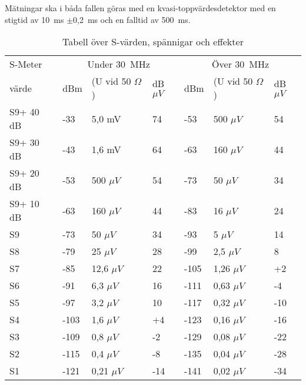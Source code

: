 Mätningar ska i båda fallen göras med en kvasi-toppvärdesdetektor
med en stigtid av 10~ms \(\pm\)0,2~ms och en falltid av 500~ms.

\onecolumn
\begin{table}[ht]
	\centering
	\begin{tabular}{l|lll|lll}
    S-Meter  & \multicolumn{3}{c}{Under 30~MHz} & \multicolumn{3}{c}{Över 30~MHz} \\
    värde    & dBm & (U vid 50 \(\Omega\)) & dB\(\mu V\) & dBm & (U vid 50 \(\Omega\)) & dB\(\mu V\) \\
    \hline
    S9+ 40 dB & -33  & 5,0 mV  & 74  & -53  & 500 \(\mu V\) & 54  \\
    S9+ 30 dB & -43  & 1,6 mV  & 64  & -63  & 160 \(\mu V\) & 44  \\
    S9+ 20 dB & -53  & 500 \(\mu V\)  & 54  & -73  & 50 \(\mu V\) & 34  \\
    S9+ 10 dB & -63  & 160 \(\mu V\)  & 44  & -83  & 16 \(\mu V\) & 24  \\
    S9        & -73  & 50 \(\mu V\)   & 34  & -93  & 5 \(\mu V\) & 14  \\
    S8        & -79  & 25 \(\mu V\)   & 28  & -99  & 2,5 \(\mu V\) & 8   \\
    S7        & -85  & 12,6 \(\mu V\) & 22  & -105 & 1,26 \(\mu V\) & +2  \\
    S6        & -91  & 6,3 \(\mu V\)  & 16  & -111 & 0,63 \(\mu V\) & -4  \\
    S5        & -97  & 3,2 \(\mu V\)  & 10  & -117 & 0,32 \(\mu V\) & -10 \\
    S4        & -103 & 1,6 \(\mu V\)  & +4  & -123 & 0,16 \(\mu V\) & -16 \\
    S3        & -109 & 0,8 \(\mu V\)  & -2  & -129 & 0,08 \(\mu V\) & -22 \\
    S2        & -115 & 0,4 \(\mu V\)  & -8  & -135 & 0,04 \(\mu V\) & -28 \\
    S1        & -121 & 0,21 \(\mu V\) & -14 & -141 & 0,02 \(\mu V\) & -34 \\
  \end{tabular}
  \caption{Tabell över S-värden, spännigar och effekter}
\end{table}
\twocolumn
